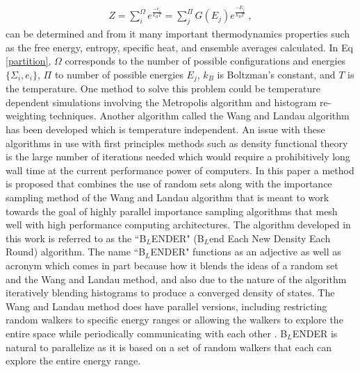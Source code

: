 \documentclass[aps,prl,reprint,superscriptaddress,showkeys]{revtex4-1}
\begin{document}
\begin{equation}
\begin{split}
Z = \sum_{i}^{\Omega}e^{\frac{-e_i}{k_B T} }= \sum_{j}^{\Pi}G(E_j)e^{\frac{-E_j}{k_BT}} \;,
\end{split}
\label{partition}
\end{equation}
can be  determined and from it many important thermodynamics properties such as the free energy, entropy, specific heat, and ensemble averages calculated. In Eq \ref{partition}, $\Omega$ corresponds to the number of possible configurations and energies $\{\Sigma_i,e_i\}$, $\Pi$ to number of possible energies $E_j$, $k_B$ is Boltzman's constant, and $T$ is the temperature. One method to solve this problem could be temperature dependent simulations involving the  Metropolis algorithm and histogram re-weighting techniques\cite{metropolis_equation_1953, landau_MC_simulations}.   Another algorithm called the  Wang and Landau algorithm\cite{WL_phys_rev_lett} has been developed which is temperature independent. An issue with these algorithms in use with first principles methods such as density functional theory is the large number of iterations needed which would require a prohibitively long wall time at the current performance power of computers.  In this paper a method is proposed that combines the use of random sets along with the importance sampling method of the Wang and Landau algorithm that is meant to work towards the goal of highly parallel importance sampling algorithms that mesh well with high performance computing architectures. The algorithm developed in this work is referred to as the ``B$_{L}$ENDER" (B$_{L}$end Each New Density Each Round) algorithm. The name ``B$_{L}$ENDER" functions as an  adjective as well as acronym which comes in part because how it blends the ideas of a random set and the Wang and Landau method, and also due to the nature of the algorithm iteratively blending histograms to produce a converged density of states.  The Wang and Landau method does have parallel versions, including  restricting random walkers to specific energy ranges or allowing the walkers to explore the entire space while periodically communicating with each other \cite{MP_Wang_Landau,P_imp_Wang_Landau, Hframe_Wang_Landau}.  B$_{L}$ENDER is natural to parallelize as it is based on a set of random walkers that each can explore the entire energy range. 
\end{document}
